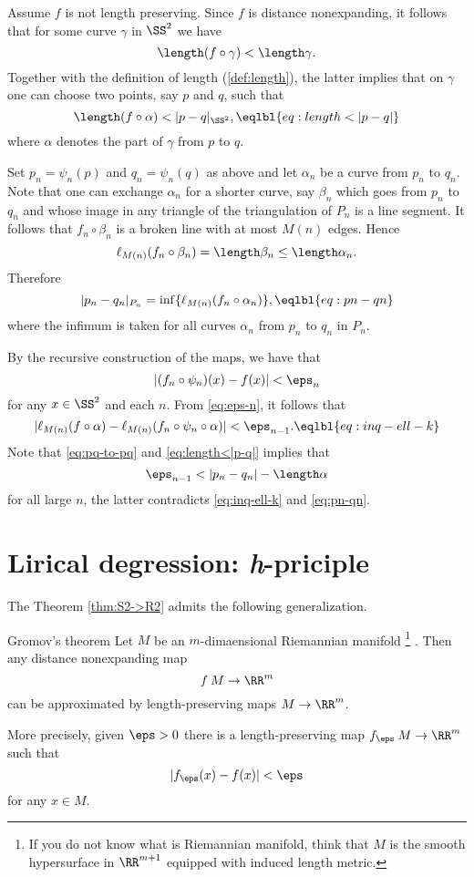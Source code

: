 \medskip

Assume $f$ is not length preserving.
Since $f$ is distance nonexpanding, it follows that for some curve 
$\gamma$ in $\SS^2$ we have 
$$\length(f\circ\gamma)<\length \gamma.$$
Together with the definition of length (\ref{def:length}),
the latter implies that on $\gamma$ one can choose two points, say $p$ and $q$, such that
$$\length (f\circ\alpha)<|p-q|_{\SS^2},\eqlbl{eq:length<|p-q|}$$
where $\alpha$ denotes the part of $\gamma$ from $p$ to $q$.

Set $p_n=\psi_n(p)$ and $q_n=\psi_n(q)$ as above and let $\alpha_n$ be a curve from $p_n$ to $q_n$.
Note that one can exchange $\alpha_n$ for a shorter curve, say $\beta_n$ which goes from $p_n$ to $q_n$ and whose image in any triangle of the triangulation of $P_n$ is a line segment.
It follows that $f_n\circ\beta_n$ is a broken line with at most $M(n)$ edges.
Hence
$$\ell_{M(n)}(f_n\circ\beta_n)=\length\beta_n\le \length\alpha_n.$$ 
Therefore
$$|p_n-q_n|_{P_n}=\inf \{\ell_{M(n)}(f_n\circ\alpha_n)\},\eqlbl{eq:pn-qn}$$
where the infimum is taken for all curves $\alpha_n$ from $p_n$ to $q_n$ in $P_n$.  

By the recursive construction of the maps, we have that
$$|(f_n\circ\psi_n)(x)-f(x)|<\eps_n$$
for any $x\in \SS^2$ and each $n$.
From \ref{eq:eps-n}, it follows that
$$|\ell_{M(n)}(f\circ\alpha)-\ell_{M(n)}(f_n\circ\psi_n\circ\alpha)|< \eps_{n-1}.\eqlbl{eq:inq-ell-k}$$
Note that \ref{eq:pq-to-pq} and \ref{eq:length<|p-q|} implies that
$$\eps_{n-1}<|p_n-q_n|-\length \alpha$$ 
for all large $n$,
the latter contradicts \ref{eq:inq-ell-k} and \ref{eq:pn-qn}.
\qeds


\section{Lirical degression: \textit{h}-priciple}

The Theorem \ref{thm:S2->R2} admits the following generalization.

\begin{thm}{Gromov's theorem}\label{thm:gromov}
Let $M$ be an $m$-dimaensional Riemannian manifold%
\footnote{If you do not know what is Riemannian manifold, think that $M$ is the smooth hypersurface in $\RR^{m+1}$ equipped with induced length metric.}%
.
Then any distance nonexpanding map 
$$f\:M\to\RR^m$$ 
can be approximated by length-preserving maps $M\to\RR^m$.

More precisely, given $\eps>0$ there is a length-preserving map $f_\eps\:M\to\RR^m$
such that 
$$|f_\eps(x)-f(x)|<\eps$$
for any $x\in M$.
\end{thm}

